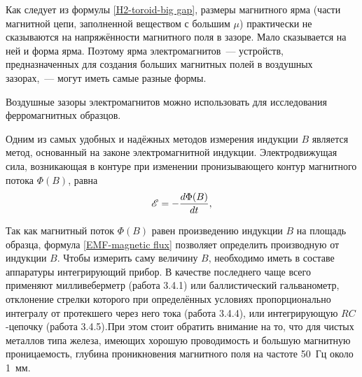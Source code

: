 Как следует из формулы \eqref{H2-toroid-big gap}, размеры магнитного ярма (части магнитной цепи, заполненной веществом с большим $\mu$) практически не сказываются на напряжённости магнитного поля в зазоре. Мало сказывается на ней и форма ярма. Поэтому ярма электромагнитов~--- устройств, предназначенных для создания больших магнитных полей в воздушных зазорах,~--- могут иметь самые разные формы.

Воздушные зазоры электромагнитов можно использовать для исследования ферромагнитных образцов.


Одним из самых удобных и надёжных методов измерения индукции $B$ является метод, основанный на законе электромагнитной индукции. Электродвижущая сила, возникающая в контуре при изменении пронизывающего контур магнитного потока $\Phi (B)$, равна
\begin{equation}
	\eqmark{EMF-magnetic flux}
	\mathscr{E} = - \frac{d\Phi (B)}{dt},
\end{equation}

Так как магнитный поток $\Phi (B)$ равен произведению индукции $B$ на площадь образца, формула \eqref{EMF-magnetic flux} позволяет определить производную от индукции $B$. Чтобы измерить саму величину $B$, необходимо иметь в составе аппаратуры интегрирующий прибор. В качестве последнего чаще всего применяют милливеберметр (работа 3.4.1) или баллистический гальванометр, отклонение стрелки которого при определённых условиях пропорционально интегралу от протекшего через него тока (работа 3.4.4), или интегрирующую $RC$-цепочку (работа 3.4.5).При этом стоит обратить внимание на то, что для чистых металлов типа железа, имеющих хорошую проводимость и большую магнитную проницаемость, глубина проникновения магнитного поля на частоте 50~Гц около 1~мм. 
